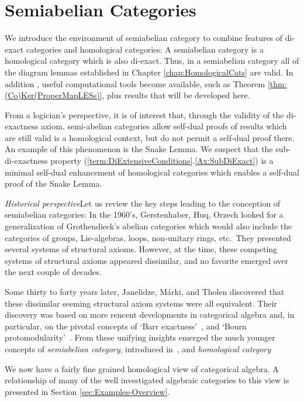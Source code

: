 \documentclass [12pt,oneside]{book}%
\theoremstyle{captionstyle}  %
\begin{document}
\chapter[Semiabelian Categories]{Semiabelian Categories}
\label{chap:SACats}

We introduce the environment of semiabelian category to combine features of di-exact categories and homological categories: A semiabelian category is a homological category which is also di-exact. Thus, in a semiabelian category all of the diagram lemmas established in Chapter \ref{chap:HomologicalCats} are valid. In addition , useful computational tools become available, such as Theorem \ref{thm:(Co)Ker(ProperMapLESs)}, plus results that will be developed here.

From a logician's perspective, it is of interest that, through the validity of the di-exactness axiom, semi-abelian categories allow self-dual proofs of results which are still valid is a homological context, but do not permit a self-dual proof there. An example of this phenomenon is the Snake Lemma. We suspect that the sub-di-exactness property (\ref{term:DiExtensiveConditions}.\ref{Ax:SubDiExact}) is a minimal self-dual enhancement of homological categories which enables a self-dual proof of the Snake Lemma.


\emph{Historical perspective}\quad Let us review the key steps leading to the conception of semiabelian categories: In the 1960's, Gerstenhaber, Huq, Orzech \cite{Huq, Gerstenhaber, Orzech} looked for a generalization of Grothendieck's abelian categories which would also include the categories of groups, Lie-algebras, loops, non-unitary rings, etc.\ They presented several systems of structural axioms. However, at the time, these competing systems of structural axioms appeared dissimilar, and no favorite emerged over the next couple of decades.

Some thirty to forty years later, Janelidze, Márki, and Tholen discovered that these dissimilar seeming structural axiom systems were all equivalent. Their discovery was based on more rencent developments in categorical algebra and, in particular, on the pivotal concepts of `Barr exactness'~\cite{Barr}, and `Bourn protomodularity'~\cite{DBourn1991, DBourn2001}. 	From these unifying insights emerged the much younger concepts of \emph{semiabelian category}, introduced  in~\cite{Janelidze-Marki-Tholen}, and \emph{homological category} \cite{FBorceuxDBourn2004}

We now have a fairly fine grained homological view of categorical algebra. A relationship of many of the well investigated algebraic categories to this view is presented in Section \ref{sec:Examples-Overview}.
\end{document}
